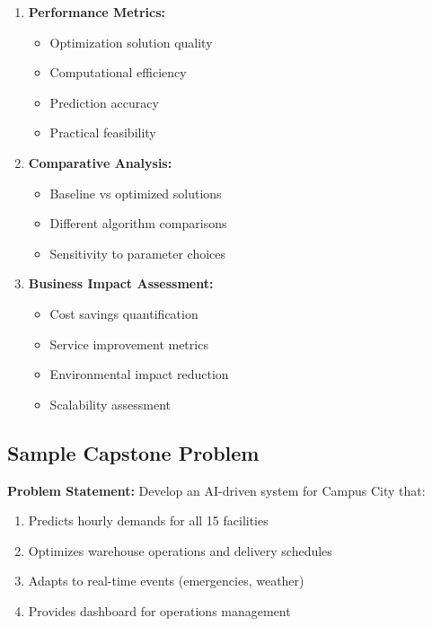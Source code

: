 \documentclass[
  letterpaper,
  DIV=11,
  numbers=noendperiod]{scrreprt}
\providecommand{\tightlist}{%
  \setlength{\itemsep}{0pt}\setlength{\parskip}{0pt}}
\begin{document}
\begin{enumerate}
\def\labelenumi{\arabic{enumi}.}
\item
  \textbf{Performance Metrics:}

  \begin{itemize}
  \tightlist
  \item
    Optimization solution quality
  \item
    Computational efficiency
  \item
    Prediction accuracy
  \item
    Practical feasibility
  \end{itemize}
\item
  \textbf{Comparative Analysis:}

  \begin{itemize}
  \tightlist
  \item
    Baseline vs optimized solutions
  \item
    Different algorithm comparisons
  \item
    Sensitivity to parameter choices
  \end{itemize}
\item
  \textbf{Business Impact Assessment:}

  \begin{itemize}
  \tightlist
  \item
    Cost savings quantification
  \item
    Service improvement metrics
  \item
    Environmental impact reduction
  \item
    Scalability assessment
  \end{itemize}
\end{enumerate}

\subsection{Sample Capstone Problem}\label{sample-capstone-problem}

\textbf{Problem Statement:} Develop an AI-driven system for Campus City
that:

\begin{enumerate}
\def\labelenumi{\arabic{enumi}.}
\tightlist
\item
  Predicts hourly demands for all 15 facilities
\item
  Optimizes warehouse operations and delivery schedules
\item
  Adapts to real-time events (emergencies, weather)
\item
  Provides dashboard for operations management
\end{enumerate}
\end{document}
